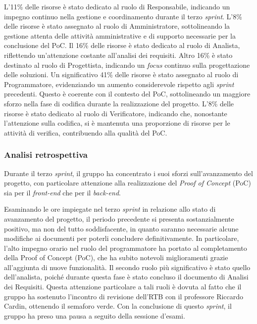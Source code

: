 L'11\% delle risorse è stato dedicato al ruolo di Responsabile, indicando un impegno continuo nella gestione e coordinamento durante il terzo \textit{sprint}.
L'8\% delle risorse è stato assegnato al ruolo di Amministratore, sottolineando la gestione attenta delle attività amministrative e di supporto necessarie per la conclusione del PoC.
Il 16\% delle risorse è stato dedicato al ruolo di Analista, riflettendo un'attenzione costante all'analisi dei requisiti.
Altro 16\% è stato destinato al ruolo di Progettista, indicando un \textit{focus} continuo sulla progettazione delle soluzioni.
Un significativo 41\% delle risorse è stato assegnato al ruolo di Programmatore, evidenziando un aumento considerevole rispetto agli \textit{sprint} precedenti.
Questo è coerente con il contesto del PoC, sottolineando un maggiore sforzo nella fase di codifica durante la realizzazione del progetto.
L'8\% delle risorse è stato dedicato al ruolo di Verificatore, indicando che, nonostante l'attenzione sulla codifica, si è mantenuta una proporzione di risorse per le attività di verifica, contribuendo alla qualità del PoC.

\subsubsection{Analisi retrospettiva}

Durante il terzo \textit{sprint}, il gruppo ha concentrato i suoi sforzi sull'avanzamento del progetto, con particolare attenzione alla realizzazione del \textit{Proof of Concept}
(PoC) sia per il \textit{front-end} che per il \textit{back-end}.

Esaminando le ore impiegate nel terzo \textit{sprint} in relazione allo stato di avanzamento del progetto, il periodo precedente si presenta sostanzialmente positivo, ma
non del tutto soddisfacente, in quanto saranno necessarie alcune modifiche ai documenti per poterli concludere definitivamente. In particolare, l'alto impegno
orario nel ruolo del programmatore ha portato al completamento della Proof of
Concept (PoC), che ha subito notevoli miglioramenti grazie all'aggiunta di nuove
funzionalità. Il secondo ruolo più significativo è stato quello dell'analista,
poiché durante questa fase è stato concluso il documento di Analisi dei
Requisiti.
Questa attenzione particolare a tali ruoli è dovuta al fatto che il gruppo ha
sostenuto l'incontro di revisione dell'RTB con il professore Riccardo Cardin,
ottenendo il semaforo verde.
Con la conclusione di questo \textit{sprint}, il gruppo ha preso una pausa a
seguito della sessione d'esami.


